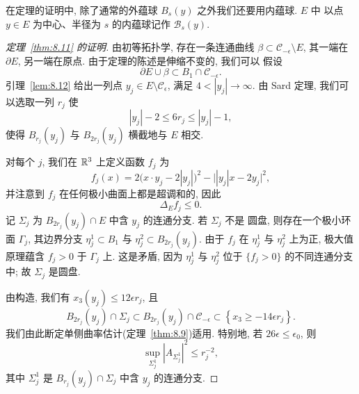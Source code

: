 在定理的证明中, 除了通常的外蕴球 $B_s(y)$ 之外我们还要用内蕴球. $E$ 中
以点 $y\in E$ 为中心、半径为 $s$ 的内蕴球记作 $\mathcal{B}_s(y)$.

\begin{proof}[定理~\ref{thm:8.11} 的证明]
由初等拓扑学, 存在一条连通曲线 $\beta\subset\mathcal{C}_{-\epsilon}\setminus E$,
其一端在 $\partial E$, 另一端在原点. 由于定理的陈述是伸缩不变的, 我们可以
假设
\begin{equation}
\partial E\cup\beta\subset B_1\cap\mathcal{C}_{-\epsilon}.
\label{eq:8.68}
\end{equation}
引理~\ref{lem:8.12} 给出一列点 $y_j\in E\setminus\mathcal{C}_\epsilon$, 满足
$4<|y_j|\to\infty$. 由 Sard 定理, 我们可以选取一列 $r_j$ 使
\begin{equation}
|y_j|-2\leq6r_j\leq|y_j|-1,
\label{eq:8.69}
\end{equation}
使得 $B_{r_j}(y_j)$ 与 $B_{2r_j}(y_j)$ 横截地与 $E$ 相交.

对每个 $j$, 我们在 $\mathbb{R}^3$ 上定义函数 $f_j$ 为
\begin{equation}
f_j(x)=2\bigl(x\cdot y_j-2|y_j|\bigr)^2-\bigl||y_j|x-2y_j\bigr|^2,
\label{eq:8.70}
\end{equation}
并注意到 $f_j$ 在任何极小曲面上都是超调和的, 因此
\begin{equation}
\Delta_Ef_j\leq0.
\label{eq:8.71}
\end{equation}
记 $\Sigma_j$ 为 $B_{2r_j}(y_j)\cap E$ 中含 $y_j$ 的连通分支. 若 $\Sigma_j$ 不是
圆盘, 则存在一个极小环面 $\Gamma_j$, 其边界分支
$\eta_j^1\subset B_1$ 与 $\eta_j^2\subset B_{2r_j}(y_j)$. 由于 $f_j$ 在
$\eta_j^1$ 与 $\eta_j^2$ 上为正, 极大值原理蕴含 $f_j>0$ 于 $\Gamma_j$ 上.
这是矛盾, 因为 $\eta_j^1$ 与 $\eta_j^2$ 位于 $\{f_j>0\}$ 的不同连通分支中;
故 $\Sigma_j$ 是圆盘.

由构造, 我们有 $x_3(y_j)\leq12\epsilon r_j$, 且
\begin{equation}
B_{2r_j}(y_j)\cap\Sigma_j\subset B_{2r_j}(y_j)\cap\mathcal{C}_{-\epsilon}
\subset\left\{x_3\geq-14\epsilon r_j\right\}.
\label{eq:8.72}
\end{equation}
我们由此断定单侧曲率估计(定理~\ref{thm:8.9})适用. 特别地, 若
$26\epsilon\leq\epsilon_0$, 则
\begin{equation}
\sup_{\Sigma_j^1}|A_{\Sigma_j^1}|^2\leq r_j^{-2},
\label{eq:8.73}
\end{equation}
其中 $\Sigma_j^1$ 是 $B_{r_j}(y_j)\cap\Sigma_j$ 中含 $y_j$ 的连通分支.


\end{proof}
